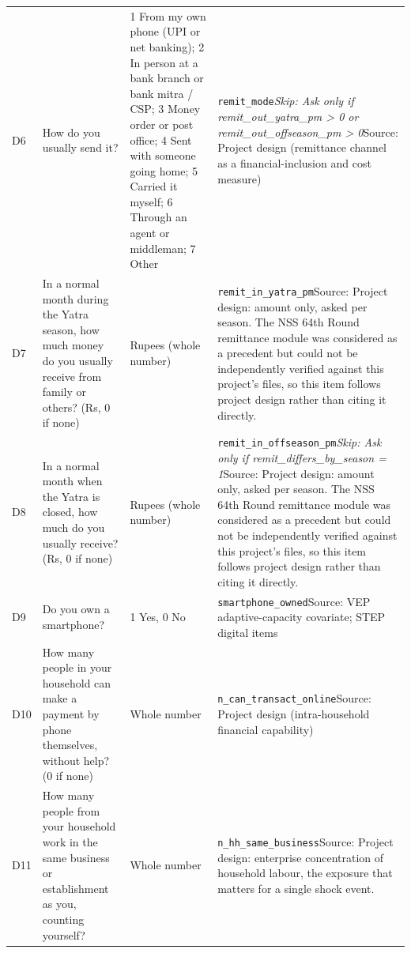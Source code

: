 \documentclass[10pt]{article}
\begin{document}
{\begin{longtable}{p{0.8cm}p{6.4cm}p{3.6cm}p{5.8cm}}
D6 & How do you usually send it? & 1 From my own phone (UPI or net banking); 2 In person at a bank branch or bank mitra / CSP; 3 Money order or post office; 4 Sent with someone going home; 5 Carried it myself; 6 Through an agent or middleman; 7 Other & \texttt{remit\_mode}\newline \textit{Skip: Ask only if remit\_out\_yatra\_pm > 0 or remit\_out\_offseason\_pm > 0}\newline Source: Project design (remittance channel as a financial-inclusion and cost measure) \\
D7 & In a normal month during the Yatra season, how much money do you usually receive from family or others? (Rs, 0 if none) & Rupees (whole number) & \texttt{remit\_in\_yatra\_pm}\newline Source: Project design: amount only, asked per season. The NSS 64th Round remittance module was considered as a precedent but could not be independently verified against this project's files, so this item follows project design rather than citing it directly. \\
D8 & In a normal month when the Yatra is closed, how much do you usually receive? (Rs, 0 if none) & Rupees (whole number) & \texttt{remit\_in\_offseason\_pm}\newline \textit{Skip: Ask only if remit\_differs\_by\_season = 1}\newline Source: Project design: amount only, asked per season. The NSS 64th Round remittance module was considered as a precedent but could not be independently verified against this project's files, so this item follows project design rather than citing it directly. \\
D9 & Do you own a smartphone? & 1 Yes, 0 No & \texttt{smartphone\_owned}\newline Source: VEP adaptive-capacity covariate; STEP digital items \\
D10 & How many people in your household can make a payment by phone themselves, without help? (0 if none) & Whole number & \texttt{n\_can\_transact\_online}\newline Source: Project design (intra-household financial capability) \\
D11 & How many people from your household work in the same business or establishment as you, counting yourself? & Whole number & \texttt{n\_hh\_same\_business}\newline Source: Project design: enterprise concentration of household labour, the exposure that matters for a single shock event. \\

\end{longtable}}
\end{document}
